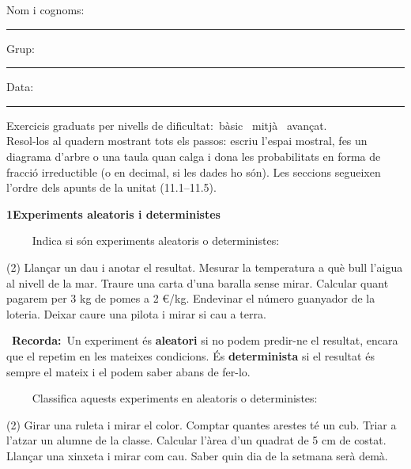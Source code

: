 \documentclass[11pt,a4paper]{article}
\newcommand{\estrelles}[1]{{\color{accent}\ifcase#1\or\faStar\faStar[regular]\faStar[regular]\or\faStar\faStar\faStar[regular]\or\faStar\faStar\faStar\fi}}
\newcounter{exer}
\newcommand{\ex}[1]{\par\needspace{4\baselineskip}\medskip\stepcounter{exer}\noindent{\color{navy}\bfseries\theexer.}\ \ {\small\estrelles{#1}}\ \ }
\newcommand{\seccio}[2]{\par\needspace{10\baselineskip}\bigskip
  \begin{tcolorbox}[colback=navy,colframe=navy,coltext=white,arc=2mm,boxrule=0pt,left=3mm,right=3mm,top=1.2mm,bottom=1.2mm]
  {\large\bfseries #1\quad #2}
  \end{tcolorbox}\vspace{-2pt}}
\newcommand{\recorda}[1]{\par\smallskip\begin{tcolorbox}[colback=accent!7,colframe=accent!55,arc=2mm,boxrule=0.5pt,left=2.5mm,right=2.5mm,top=1mm,bottom=1mm]\small{\color{accent}\faLightbulb[regular]}\ \textbf{Recorda:}\ #1\end{tcolorbox}}
\begin{document}
\thispagestyle{primera}

\vspace{10pt}
Nom i cognoms: \rule{8.4cm}{0.4pt}\hfill Grup: \rule{1.6cm}{0.4pt}\hfill Data: \rule{2.2cm}{0.4pt}
\vspace{8pt}

\begin{tcolorbox}[colback=soft,colframe=soft,arc=2mm,left=3mm,right=3mm,top=1.5mm,bottom=1.5mm]
\small Exercicis graduats per nivells de dificultat:\quad \estrelles{1}\ bàsic \qquad \estrelles{2}\ mitjà \qquad \estrelles{3}\ avançat.\\[2pt] Resol-los al quadern mostrant tots els passos: escriu l'espai mostral, fes un diagrama d'arbre o una taula quan calga i dona les probabilitats en forma de fracció irreductible (o en decimal, si les dades ho són). Les seccions segueixen l'ordre dels apunts de la unitat (11.1--11.5).
\end{tcolorbox}

\seccio{1}{Experiments aleatoris i deterministes}

\ex{1} Indica si són experiments aleatoris o deterministes:\begin{tasks}(2)
  \task Llançar un dau i anotar el resultat.
  \task Mesurar la temperatura a què bull l'aigua al nivell de la mar.
  \task Traure una carta d'una baralla sense mirar.
  \task Calcular quant pagarem per 3 kg de pomes a 2 €/kg.
  \task Endevinar el número guanyador de la loteria.
  \task Deixar caure una pilota i mirar si cau a terra.
\end{tasks}\recorda{Un experiment és \textbf{aleatori} si no podem predir-ne el resultat, encara que el repetim en les mateixes condicions. És \textbf{determinista} si el resultat és sempre el mateix i el podem saber abans de fer-lo.}

\ex{1} Classifica aquests experiments en aleatoris o deterministes:\begin{tasks}(2)
  \task Girar una ruleta i mirar el color.
  \task Comptar quantes arestes té un cub.
  \task Triar a l'atzar un alumne de la classe.
  \task Calcular l'àrea d'un quadrat de 5 cm de costat.
  \task Llançar una xinxeta i mirar com cau.
  \task Saber quin dia de la setmana serà demà.
\end{tasks}
\end{document}

